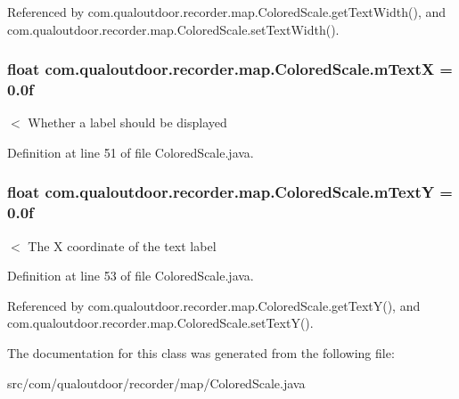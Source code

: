 Referenced by com.\-qualoutdoor.\-recorder.\-map.\-Colored\-Scale.\-get\-Text\-Width(), and com.\-qualoutdoor.\-recorder.\-map.\-Colored\-Scale.\-set\-Text\-Width().

\hypertarget{classcom_1_1qualoutdoor_1_1recorder_1_1map_1_1ColoredScale_a84b3e55223428d8643cec8188439e531}{
\subsubsection[{m\-Text\-X}]{\setlength{\rightskip}{0pt plus 5cm}float com.\-qualoutdoor.\-recorder.\-map.\-Colored\-Scale.\-m\-Text\-X = 0.\-0f\hspace{0.3cm}{\ttfamily [private]}}}\label{classcom_1_1qualoutdoor_1_1recorder_1_1map_1_1ColoredScale_a84b3e55223428d8643cec8188439e531}
$<$ Whether a label should be displayed 

Definition at line 51 of file Colored\-Scale.\-java.

\hypertarget{classcom_1_1qualoutdoor_1_1recorder_1_1map_1_1ColoredScale_ab569fbf05d637f90977cc654ceea7347}{
\subsubsection[{m\-Text\-Y}]{\setlength{\rightskip}{0pt plus 5cm}float com.\-qualoutdoor.\-recorder.\-map.\-Colored\-Scale.\-m\-Text\-Y = 0.\-0f\hspace{0.3cm}{\ttfamily [private]}}}\label{classcom_1_1qualoutdoor_1_1recorder_1_1map_1_1ColoredScale_ab569fbf05d637f90977cc654ceea7347}
$<$ The X coordinate of the text label 

Definition at line 53 of file Colored\-Scale.\-java.



Referenced by com.\-qualoutdoor.\-recorder.\-map.\-Colored\-Scale.\-get\-Text\-Y(), and com.\-qualoutdoor.\-recorder.\-map.\-Colored\-Scale.\-set\-Text\-Y().



The documentation for this class was generated from the following file\-:\begin{DoxyCompactItemize}
\item 
src/com/qualoutdoor/recorder/map/Colored\-Scale.\-java\end{DoxyCompactItemize}
